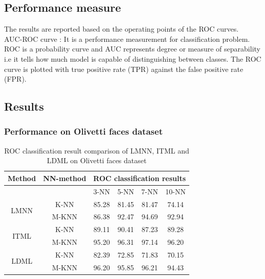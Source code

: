 \documentclass{article}
\begin{document}
\subsection{Performance measure}
The results are reported based on the operating points of the ROC curves.\\
[0.5cm]
AUC-ROC curve : It is a performance measurement for classification problem. ROC is a probability curve and AUC represents degree or measure of separability i.e it tells how much model is capable of distinguishing between classes. The ROC curve is plotted with true positive rate (TPR) against the false positive rate (FPR).

\subsection{Results}
\subsubsection{Performance on Olivetti faces dataset}


\begin{table}[H]
    \centering
    \begin{tabular}{|*{6}{c|}}
    \hline
    \multicolumn{1}{|c}{Method} & \multicolumn{1}{|c|}{NN-method} & \multicolumn{4}{|c|}{ROC classification results} \\ \hline
    \multicolumn{1}{|c|}{} & \multicolumn{1}{|c|}{} & 3-NN & 5-NN & 7-NN & 10-NN \\ \hline
    \multirow{2}{*}{LMNN} & K-NN & 85.28 & 81.45 & 81.47 & 74.14 \\ \cline{2-6}
    & M-KNN & 86.38 & 92.47 & 94.69 & 92.94 \\ \hline
    \multirow{2}{*}{ITML} & K-NN & 89.11 & 90.41 & 87.23 & 89.28 \\ \cline{2-6}
    & M-KNN & 95.20 & 96.31 & 97.14 & 96.20 \\ \hline
    \multirow{2}{*}{LDML} & K-NN & 82.39 & 72.85 & 71.83 & 70.15 \\ \cline{2-6}
    & M-KNN & 96.20 & 95.85 & 96.21 & 94.43 \\ \hline
    \end{tabular}
    \caption{ROC classification result comparison of LMNN, ITML and LDML on Olivetti faces dataset}
    \label{tab:my_label}
\end{table}
\end{document}
